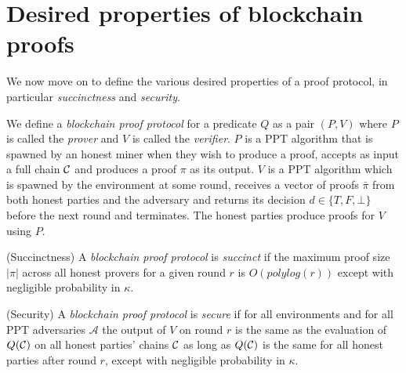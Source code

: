 \section{Desired properties of blockchain proofs}

We now move on to define the various desired properties of a proof protocol, in
particular \textit{succinctness} and \textit{security}.

We define a \textit{blockchain proof protocol} for a predicate $Q$ as a pair
$(P, V)$ where $P$ is called the \textit{prover} and $V$ is called the
\textit{verifier}. $P$ is a PPT algorithm that is spawned by an honest miner
when they wish to produce a proof, accepts as input a full chain $\mathcal{C}$ and
produces a proof $\pi$ as its output. $V$ is a PPT algorithm which is spawned
by the environment at some round, receives a vector of proofs $\bar{\pi}$ from
both honest parties and the adversary and returns its decision $d \in \{T, F,
\bot\}$ before the next round and terminates. The honest parties produce proofs
for $V$ using $P$.

\begin{definition}{(Succinctness)}
A \textit{blockchain proof protocol} is \textit{succinct} if the maximum proof
size $|\pi|$ across all honest provers for a given round $r$ is $O(polylog(r))$
except with negligible probability in $\kappa$.
\end{definition}

\begin{definition}{(Security)}
A \textit{blockchain proof protocol} is \textit{secure} if for all environments
and for all PPT adversaries $\mathcal{A}$ the output of $V$ on round $r$ is the
same as the evaluation of $Q(\mathcal{C})$ on all honest parties' chains $\mathcal{C}$ as
long as $Q(\mathcal{C})$ is the same for all honest parties after round $r$, except
with negligible probability in $\kappa$.
\end{definition}
